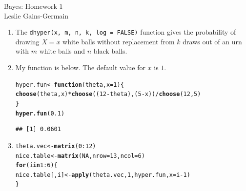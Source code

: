 \documentclass[12pt]{article}\usepackage[]{graphicx}\usepackage[]{color}
\makeatletter
\newcommand{\hlnum}[1]{\textcolor[rgb]{0.686,0.059,0.569}{#1}}%
\newcommand{\hlopt}[1]{\textcolor[rgb]{0,0,0}{#1}}%
\newcommand{\hlstd}[1]{\textcolor[rgb]{0.345,0.345,0.345}{#1}}%
\newcommand{\hlkwa}[1]{\textcolor[rgb]{0.161,0.373,0.58}{\textbf{#1}}}%
\newcommand{\hlkwb}[1]{\textcolor[rgb]{0.69,0.353,0.396}{#1}}%
\newcommand{\hlkwc}[1]{\textcolor[rgb]{0.333,0.667,0.333}{#1}}%
\newcommand{\hlkwd}[1]{\textcolor[rgb]{0.737,0.353,0.396}{\textbf{#1}}}%
\newenvironment{kframe}{%
 \def\at@end@of@kframe{}%
 \ifinner\ifhmode%
  \def\at@end@of@kframe{\end{minipage}}%
  \begin{minipage}{\columnwidth}%
 \fi\fi%
 \def\FrameCommand##1{\hskip\@totalleftmargin \hskip-\fboxsep
 \colorbox{shadecolor}{##1}\hskip-\fboxsep
     \hskip-\linewidth \hskip-\@totalleftmargin \hskip\columnwidth}%
 \MakeFramed {\advance\hsize-\width
   \@totalleftmargin\z@ \linewidth\hsize
   \@setminipage}}%
 {\par\unskip\endMakeFramed%
 \at@end@of@kframe}
\newenvironment{knitrout}{}{} %
\makeatother
\begin{document}
  
  
\begin{center}
\large{Bayes: Homework $1$} \\
Leslie Gains-Germain
\end{center}

\begin{doublespacing}

\begin{enumerate}

\item The \verb+dhyper(x, m, n, k, log = FALSE)+ function gives the probability of drawing $X=x$ white balls without replacement from $k$ draws out of an urn with $m$ white balls and $n$ black balls.

\item My function is below. The default value for $x$ is $1$.

\begin{knitrout}\footnotesize
{}\color{fgcolor}\begin{kframe}
\begin{alltt}
\hlstd{hyper.fun} \hlkwb{<-} \hlkwa{function}\hlstd{(}\hlkwc{theta}\hlstd{,} \hlkwc{x}\hlstd{=}\hlnum{1}\hlstd{) \{}
  \hlkwd{choose}\hlstd{(theta, x)} \hlopt{*} \hlkwd{choose}\hlstd{((}\hlnum{12}\hlopt{-}\hlstd{theta), (}\hlnum{5}\hlopt{-}\hlstd{x))} \hlopt{/} \hlkwd{choose}\hlstd{(}\hlnum{12}\hlstd{,} \hlnum{5}\hlstd{)}
\hlstd{\}}
\hlkwd{hyper.fun}\hlstd{(}\hlnum{0.1}\hlstd{)}
\end{alltt}
\begin{verbatim}
## [1] 0.0601
\end{verbatim}
\end{kframe}
\end{knitrout}

\item 

\begin{knitrout}\footnotesize
{}\color{fgcolor}\begin{kframe}
\begin{alltt}
\hlstd{theta.vec} \hlkwb{<-} \hlkwd{matrix}\hlstd{(}\hlnum{0}\hlopt{:}\hlnum{12}\hlstd{)}
\hlstd{nice.table} \hlkwb{<-} \hlkwd{matrix}\hlstd{(}\hlnum{NA}\hlstd{,} \hlkwc{nrow}\hlstd{=}\hlnum{13}\hlstd{,} \hlkwc{ncol}\hlstd{=}\hlnum{6}\hlstd{)}
\hlkwa{for}\hlstd{(i} \hlkwa{in} \hlnum{1}\hlopt{:}\hlnum{6}\hlstd{)\{}
  \hlstd{nice.table[,i]} \hlkwb{<-} \hlkwd{apply}\hlstd{(theta.vec,} \hlnum{1}\hlstd{, hyper.fun,} \hlkwc{x}\hlstd{=i}\hlopt{-}\hlnum{1}\hlstd{)}
\hlstd{\}}
\end{alltt}
\end{kframe}
\end{knitrout}


\end{enumerate}
\end{doublespacing}
\end{document}
